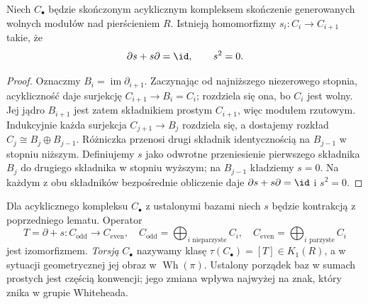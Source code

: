 \begin{lemat}
\label{lem:kontrakcja-20}
Niech $C_\bullet$ będzie skończonym acyklicznym
kompleksem skończenie generowanych wolnych modułów
nad pierścieniem $R$. Istnieją homomorfizmy
$s_i:C_i\to C_{i+1}$ takie, że
\[
 \partial s+s\partial=\id,
 \qquad s^2=0.
\]
\end{lemat}
\begin{proof}
Oznaczmy $B_i=\operatorname{im}\partial_{i+1}$.
Zaczynając od najniższego niezerowego stopnia,
acykliczność daje surjekcję $C_{i+1}\to B_i=C_i$;
rozdziela się ona, bo $C_i$ jest wolny.
Jej jądro $B_{i+1}$ jest zatem składnikiem prostym
$C_{i+1}$, więc modułem rzutowym. Indukcyjnie
każda surjekcja $C_{j+1}\to B_j$ rozdziela się,
a dostajemy rozkład
$C_j\cong B_j\oplus B_{j-1}$.
Różniczka przenosi drugi składnik identycznością
na $B_{j-1}$ w stopniu niższym. Definiujemy $s$
jako odwrotne przeniesienie pierwszego składnika
$B_j$ do drugiego składnika w stopniu wyższym;
na $B_{j-1}$ kładziemy $s=0$.
Na każdym z obu składników bezpośrednie obliczenie
daje $\partial s+s\partial=\id$ i $s^2=0$.
\end{proof}

\begin{definicja}
\label{def:torsja-kompleksu-20}
Dla acyklicznego kompleksu $C_\bullet$ z ustalonymi
bazami niech $s$ będzie kontrakcją z poprzedniego
lematu. Operator
\[
 T=\partial+s:C_{\mathrm{odd}}\longrightarrow
 C_{\mathrm{even}},\quad
 C_{\mathrm{odd}}=\bigoplus_{i\text{ nieparzyste}}C_i,
 \quad C_{\mathrm{even}}=\bigoplus_{i\text{ parzyste}}C_i
\]
jest izomorfizmem. \emph{Torsją} $C_\bullet$
nazywamy klasę $\tau(C_\bullet)=[T]\in K_1(R)$,
a w sytuacji geometrycznej jej obraz w
$\operatorname{Wh}(\pi)$. Ustalony porządek baz
w sumach prostych jest częścią konwencji; jego
zmiana wpływa najwyżej na znak, który znika
w grupie Whiteheada.
\end{definicja}

